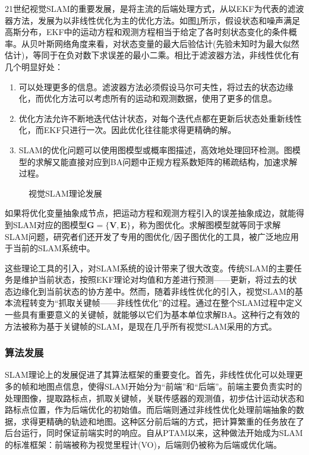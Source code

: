 21世纪视觉SLAM的重要发展，是将主流的后端处理方式，从以EKF为代表的滤波器方法，发展为以非线性优化为主的优化方法。如图\ref{fig1.1}所示，假设状态和噪声满足高斯分布，EKF中的运动方程和观测方程相当于给定了各时刻状态变化的条件概率。从贝叶斯网络角度来看，对状态变量的最大后验估计(先验未知时为最大似然估计)，等同于在负对数下求误差的最小二乘\upcite{[1.36]}。相比于滤波器方法，非线性优化有几个明显好处：
\begin{enumerate}[label={(\arabic*)}]
\item 可以处理更多的信息。滤波器方法必须假设马尔可夫性，将过去的状态边缘化，而优化方法可以考虑所有的运动和观测数据，使用了更多的信息。
\item 优化方法允许不断地迭代估计状态，对每个迭代点都在更新后状态处重新线性化，而EKF只进行一次。因此优化往往能求得更精确的解。
\item SLAM的优化问题可以使用图模型或概率图描述，高效地处理回环检测。图模型的求解又能直接对应到BA问题中正规方程系数矩阵的稀疏结构，加速求解过程。
\end{enumerate}

\vspace{-20pt}
\begin{figure}[H]
    \centering
     \caption{视觉SLAM理论发展}
\label{fig1.1}
\end{figure}
\vspace{-20pt}

如果将优化变量抽象成节点，把运动方程和观测方程引入的误差抽象成边，就能得到SLAM对应的图模型$\boldsymbol{G}=\lbrace \boldsymbol{V}, \boldsymbol{E} \rbrace$，称为图优化\upcite{[1.37]}。求解图模型就等同于求解SLAM问题，研究者们还开发了专用的图优化/因子图优化的工具\upcite{[1.37],[1.38]}，被广泛地应用于当前的SLAM系统中。


这些理论工具的引入，对SLAM系统的设计带来了很大改变。传统SLAM的主要任务是维护当前状态，按照EKF理论对均值和方差进行预测——更新，将过去的状态边缘化到当前状态的协方差中。然而，随着非线性优化的引入，视觉SLAM的基本流程转变为“抓取关键帧——非线性优化”的过程。通过在整个SLAM过程中定义一些具有重要意义的关键帧，就能够以它们为基本单位求解BA。这种行之有效的方法被称为基于关键帧的SLAM，是现在几乎所有视觉SLAM采用的方式。



\subsubsection{算法发展}
SLAM理论上的发展促进了其算法框架的重要变化。首先，非线性优化可以处理更多的帧和地图点信息，使得SLAM开始分为“前端”和“后端”。前端主要负责实时的处理图像，提取路标点，抓取关键帧，关联传感器的观测值，初步估计运动状态和路标点位置，作为后端优化的初始值。而后端则通过非线性优化处理前端抽象的数据，求得更精确的轨迹和地图。这种区分前后端的方式，把计算繁重的任务放在了后台运行，同时保证前端实时的响应。自从PTAM以来，这种做法开始成为SLAM的标准框架：前端被称为视觉里程计(VO)\upcite{[1.39]}，后端则仍被称为后端或优化端。

